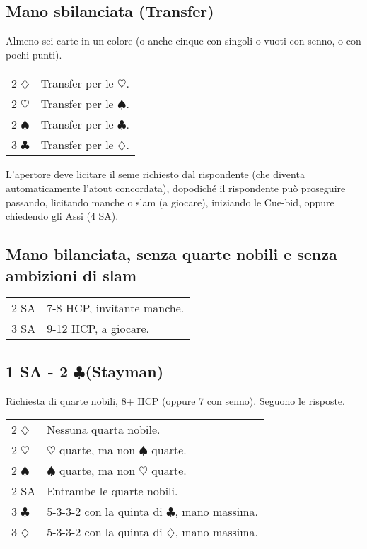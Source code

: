 \documentclass[a4paper,10pt]{article}
\renewcommand{\c}{$\clubsuit$\xspace}
\renewcommand{\d}{$\diamondsuit$\xspace}
\newcommand{\h}{$\heartsuit$\xspace}
\newcommand{\s}{$\spadesuit$\xspace}
\newcommand{\sa}{SA\xspace}
\newcommand{\smallspace}{\vskip0.3cm}
\newenvironment{twocol}
  {\smallspace\noindent\begin{tabular}{l p{0.78\textwidth}}}
  {\end{tabular}\smallspace}
\begin{document}
\subsection{Mano sbilanciata (Transfer)}

Almeno sei carte in un colore (o anche cinque con singoli o vuoti con senno, o con pochi punti).

\begin{twocol}
 2 \d & Transfer per le \h.\\
 2 \h & Transfer per le \s.\\
 2 \s & Transfer per le \c.\\
 3 \c & Transfer per le \d.\\
\end{twocol}

L'apertore deve licitare il seme richiesto dal rispondente (che diventa automaticamente l'atout concordata), dopodiché il rispondente può proseguire passando, licitando manche o slam (a giocare), iniziando le Cue-bid, oppure chiedendo gli Assi (4 \sa).


\subsection{Mano bilanciata, senza quarte nobili e senza ambizioni di slam}

\begin{twocol}
 2 \sa & 7-8 HCP, invitante manche.\\
 3 \sa & 9-12 HCP, a giocare.
\end{twocol}


\subsection{1 SA - 2 \c (Stayman)}

Richiesta di quarte nobili, 8+ HCP (oppure 7 con senno). Seguono le risposte.

\begin{twocol}
	2 \d & Nessuna quarta nobile. \\
	2 \h & \h quarte, ma non \s quarte. \\
	2 \s & \s quarte, ma non \h quarte. \\
	2 \sa & Entrambe le quarte nobili. \\
	3 \c & 5-3-3-2 con la quinta di \c, mano massima. \\
	3 \d & 5-3-3-2 con la quinta di \d, mano massima. \\
\end{twocol}
\end{document}
